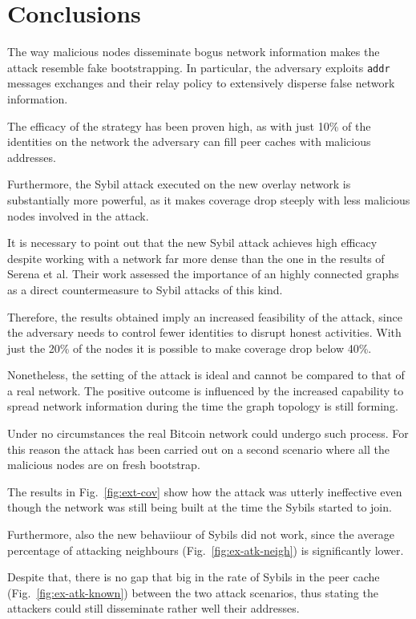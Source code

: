 \chapter{Conclusions}
\label{sec:concl}

The way malicious nodes disseminate bogus network information makes the attack resemble fake bootstrapping. In particular, the adversary exploits \texttt{addr} messages exchanges and their relay policy to extensively disperse false network information. 

The efficacy of the strategy has been proven high, as with just 10\% of the identities on the network the adversary can fill peer caches with malicious addresses.

Furthermore, the Sybil attack executed on the new overlay network is substantially more powerful, as it makes coverage drop steeply with less malicious nodes involved in the attack.

It is necessary to point out that the new Sybil attack achieves high efficacy despite working with a network far more dense than the one in the results of Serena et al. Their work assessed the importance of an highly connected graphs as a direct countermeasure to Sybil attacks of this kind.

Therefore, the results obtained imply an increased feasibility of the attack, since the adversary needs to control fewer identities to disrupt honest activities. With just the 20\% of the nodes it is possible to make coverage drop below 40\%.\par

Nonetheless, the setting of the attack is ideal and cannot be compared to that of a real network. The positive outcome is influenced by the increased capability to spread network information during the time the graph topology is still forming.

Under no circumstances the real Bitcoin network could undergo such process. For this reason the attack has been carried out on a second scenario where all the malicious nodes are on fresh bootstrap.

The results in Fig.~\ref{fig:ext-cov} show how the attack was utterly ineffective even though the network was still being built at the time the Sybils started to join.
 
Furthermore, also the new behaviiour of Sybils did not work, since the average percentage of attacking neighbours (Fig.~\ref{fig:ex-atk-neigh}) is significantly lower.

Despite that, there is no gap that big in the rate of Sybils in the peer cache (Fig.~\ref{fig:ex-atk-known}) between the two attack scenarios, thus stating the attackers could still disseminate rather well their addresses.

